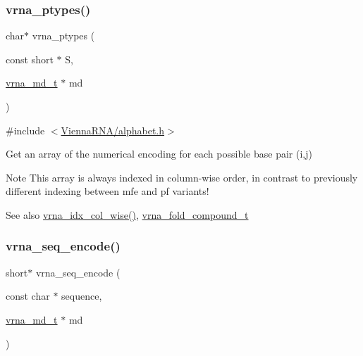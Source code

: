 \subsubsection{\texorpdfstring{vrna\_ptypes()}{vrna\_ptypes()}}
{\footnotesize\ttfamily char$\ast$ vrna\+\_\+ptypes (\begin{DoxyParamCaption}\item[{const short $\ast$}]{S,  }\item[{\mbox{\hyperlink{group__model__details_ga1f8a10e12a0a1915f2a4eff0b28ea17c}{vrna\+\_\+md\+\_\+t}} $\ast$}]{md }\end{DoxyParamCaption})}



{\ttfamily \#include $<$\mbox{\hyperlink{alphabet_8h}{Vienna\+R\+N\+A/alphabet.\+h}}$>$}



Get an array of the numerical encoding for each possible base pair (i,j) 

\begin{DoxyNote}{Note}
This array is always indexed in column-\/wise order, in contrast to previously different indexing between mfe and pf variants!
\end{DoxyNote}
\begin{DoxySeeAlso}{See also}
\mbox{\hyperlink{group__utils_ga89ebc69c52fa0c78c9e1974b0017746b}{vrna\+\_\+idx\+\_\+col\+\_\+wise()}}, \mbox{\hyperlink{group__fold__compound_ga1b0cef17fd40466cef5968eaeeff6166}{vrna\+\_\+fold\+\_\+compound\+\_\+t}} 
\end{DoxySeeAlso}
\mbox{\label{group__alphabet__utils_ga636e7d6f888fd639587296a5eddea660}} 
\subsubsection{\texorpdfstring{vrna\_seq\_encode()}{vrna\_seq\_encode()}}
{\footnotesize\ttfamily short$\ast$ vrna\+\_\+seq\+\_\+encode (\begin{DoxyParamCaption}\item[{const char $\ast$}]{sequence,  }\item[{\mbox{\hyperlink{group__model__details_ga1f8a10e12a0a1915f2a4eff0b28ea17c}{vrna\+\_\+md\+\_\+t}} $\ast$}]{md }\end{DoxyParamCaption})}



